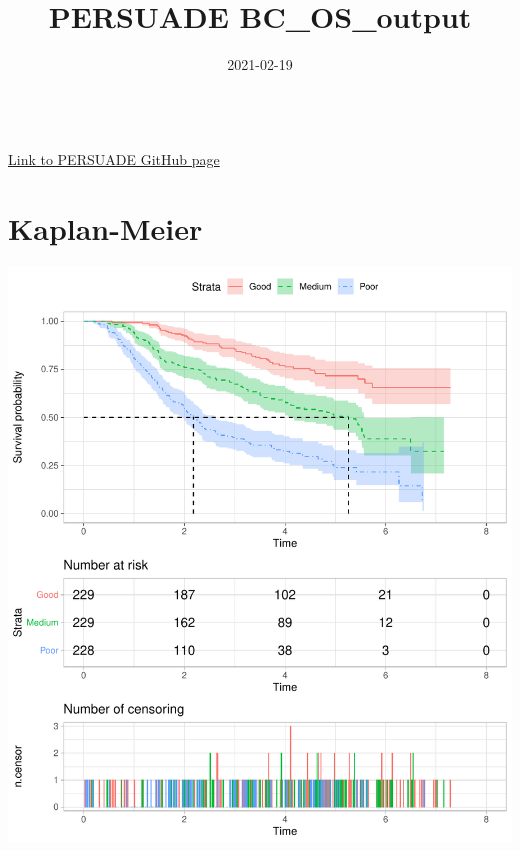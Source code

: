 \documentclass[
]{article}
\title{PERSUADE BC\_OS\_output}
\author{}
\date{\vspace{-2.5em}2021-02-19}
\begin{document}
\maketitle

{
\hypersetup{linkcolor=}
\setcounter{tocdepth}{2}
\tableofcontents
}
~\\

\href{https://github.com/Bram-R/PERSUADE}{Link to PERSUADE GitHub page}
\newpage

\hypertarget{kaplan-meier}{%
\section{Kaplan-Meier}\label{kaplan-meier}}

\begin{flushleft}\includegraphics{Images/plot_KM-1} \end{flushleft}
\end{document}
